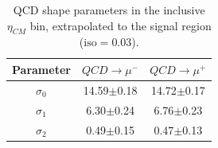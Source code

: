 \begin{table}[htbp]
  \begin{center}
   \begin{tabular}{|c|c|c|}\hline
    Parameter & $QCD \to \mu^{-}$ & $QCD \to \mu^{+}$ \\\hline
    $\sigma_{0}$ & 14.59$\pm$0.18 & 14.72$\pm$0.17 \\\hline
    $\sigma_{1}$ & 6.30$\pm$0.24 & 6.76$\pm$0.23 \\\hline
    $\sigma_{2}$ & 0.49$\pm$0.15 & 0.47$\pm$0.13 \\\hline
   \end{tabular}
  \end{center}
  \caption{QCD shape parameters in the inclusive $\eta_{CM}$ bin, extrapolated to the signal region ($\text{iso} = 0.03$).}
  \label{tab:QCD_Extrapolation}
\end{table}

